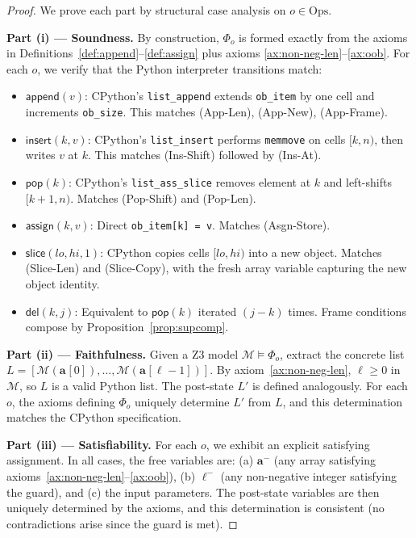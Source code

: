 \documentclass[11pt]{article}
\newcommand{\arrvar}[1]{\mathbf{a}_{#1}}
\newcommand{\lenvar}[1]{\ell_{#1}}
\newcommand{\MutApp}{\ensuremath{\mathsf{append}}}
\newcommand{\MutIns}{\ensuremath{\mathsf{insert}}}
\newcommand{\MutPop}{\ensuremath{\mathsf{pop}}}
\newcommand{\MutDel}{\ensuremath{\mathsf{del}}}
\newcommand{\MutSlice}{\ensuremath{\mathsf{slice}}}
\newcommand{\MutAssign}{\ensuremath{\mathsf{assign}}}
\newcommand{\prestate}[1]{#1^{-}}
\begin{document}
\begin{proof}
We prove each part by structural case analysis on $o \in \mathrm{Ops}$.

\textbf{Part (i) --- Soundness.}
By construction, $\Phi_o$ is formed exactly from the axioms in
Definitions~\ref{def:append}--\ref{def:assign} plus axioms
\eqref{ax:non-neg-len}--\eqref{ax:oob}.
For each $o$, we verify that the Python interpreter transitions match:
\begin{itemize}[nosep]
  \item $\MutApp(v)$: CPython's \texttt{list\_append} extends \texttt{ob\_item}
        by one cell and increments \texttt{ob\_size}.  This matches (App-Len),
        (App-New), (App-Frame).
  \item $\MutIns(k,v)$: CPython's \texttt{list\_insert} performs
        \texttt{memmove} on cells $[k, n)$, then writes $v$ at $k$.
        This matches (Ins-Shift) followed by (Ins-At).
  \item $\MutPop(k)$: CPython's \texttt{list\_ass\_slice} removes element at
        $k$ and left-shifts $[k+1,n)$.  Matches (Pop-Shift) and (Pop-Len).
  \item $\MutAssign(k,v)$: Direct \texttt{ob\_item[k] = v}.  Matches (Asgn-Store).
  \item $\MutSlice(lo,hi,1)$: CPython copies cells $[lo,hi)$ into a new
        object.  Matches (Slice-Len) and (Slice-Copy), with the fresh array
        variable capturing the new object identity.
  \item $\MutDel(k,j)$: Equivalent to $\MutPop(k)$ iterated $(j-k)$ times.
        Frame conditions compose by Proposition~\ref{prop:supcomp}.
\end{itemize}

\textbf{Part (ii) --- Faithfulness.}
Given a Z3 model $\mathcal{M} \models \Phi_o$, extract the concrete list
$L = [\mathcal{M}(\arrvar{}[0]),\ldots,\mathcal{M}(\arrvar{}[\lenvar{}-1])]$.
By axiom~\eqref{ax:non-neg-len}, $\lenvar{} \geq 0$ in $\mathcal{M}$, so $L$
is a valid Python list.  The post-state $L'$ is defined analogously.
For each $o$, the axioms defining $\Phi_o$ uniquely determine $L'$ from
$L$, and this determination matches the CPython specification.

\textbf{Part (iii) --- Satisfiability.}
For each $o$, we exhibit an explicit satisfying assignment.  In all cases,
the free variables are: (a) $\prestate{\arrvar{}}$ (any array satisfying
axioms~\eqref{ax:non-neg-len}--\eqref{ax:oob}), (b) $\prestate{\lenvar{}}$
(any non-negative integer satisfying the guard), and (c) the input parameters.
The post-state variables are then uniquely determined by the axioms, and
this determination is consistent (no contradictions arise since the guard
is met).
\end{proof}
\end{document}
